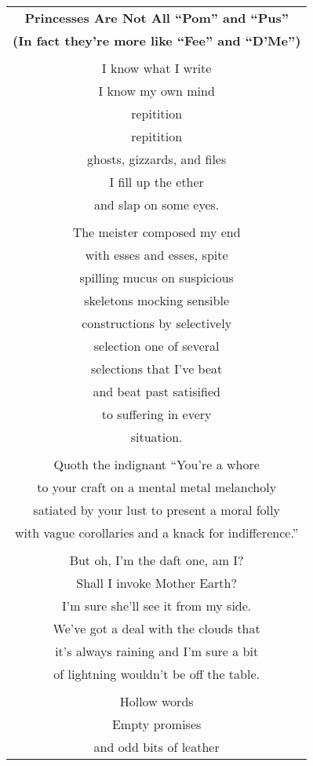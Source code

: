 \documentclass{article}
\begin{document}
\begin{center}
\begin{tabular}{c}
\textbf{Princesses Are Not All ``Pom'' and ``Pus''} \\
{\small\textbf{(In fact they're more like ``Fee'' and ``D'Me'')}} \\
\\
I know what I write \\
I know my own mind \\
repitition \\
repitition \\
ghosts, gizzards, and files \\
I fill up the ether \\
and slap on some eyes. \\
\\
The meister composed my end \\
with esses and esses, spite \\
spilling mucus on suspicious \\
skeletons mocking sensible \\
constructions by selectively \\
selection one of several \\
selections that I've beat \\
and beat past satisified \\
to suffering in every \\
situation. \\
\\
Quoth the indignant ``You're a whore \\
to your craft on a mental metal melancholy \\
satiated by your lust to present a moral folly \\
with vague corollaries and a knack for indifference.'' \\
\\
But oh, I'm the daft one, am I? \\
Shall I invoke Mother Earth? \\
I'm sure she'll see it from my side. \\
We've got a deal with the clouds that \\
it's always raining and I'm sure a bit \\
of lightning wouldn't be off the table. \\
\\
Hollow words \\
Empty promises \\
and odd bits of leather \\

\end{tabular}
\end{center}
\end{document}
